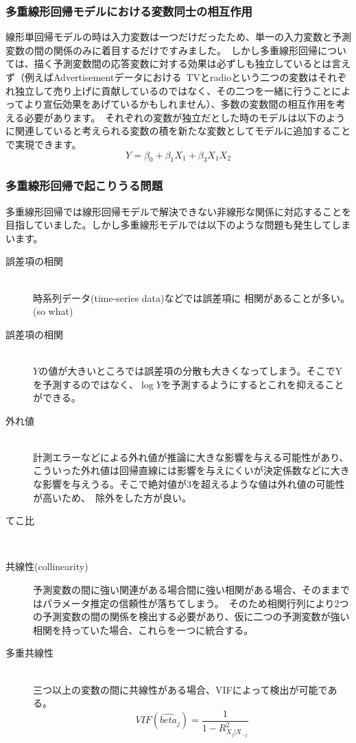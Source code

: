 \documentclass[uplatex]{jsarticle}
\begin{document}
\subsubsection{多重線形回帰モデルにおける変数同士の相互作用}
線形単回帰モデルの時は入力変数は一つだけだったため、単一の入力変数と予測変数の間の関係のみに着目するだけですみました。\
しかし多重線形回帰については、描く予測変数間の応答変数に対する効果は必ずしも独立しているとは言えず（例えばAdvertisementデータにおける\
TVとradioという二つの変数はそれぞれ独立して売り上げに貢献しているのではなく、その二つを一緒に行うことによってより宣伝効果をあげているかもしれません）、多数の変数間の相互作用を考える必要があります。\
それぞれの変数が独立だとした時のモデルは以下のように関連していると考えられる変数の積を新たな変数としてモデルに追加することで実現できます。
$$Y = \beta_0 + \beta_1 X_1 + \beta_3 X_1X_2$$

\subsubsection{多重線形回帰で起こりうる問題}
多重線形回帰では線形回帰モデルで解決できない非線形な関係に対応することを目指していました。しかし多重線形モデルでは以下のような問題も発生してしまいます。
\begin{description}
  \item[誤差項の相関]\mbox{}\\
  時系列データ(time-series data)などでは誤差項に 相関があることが多い。(so what)
  \item[誤差項の相関]\mbox{}\\
  $Y$の値が大きいところでは誤差項の分散も大きくなってしまう。そこでYを予測するのではなく、$\log{Y}$を予測するようにするとこれを抑えることができる。
  \item[外れ値]\mbox{}\\
  計測エラーなどによる外れ値が推論に大きな影響を与える可能性があり、こういった外れ値は回帰直線には影響を与えにくいが決定係数などに大きな影響を与えうる。そこで絶対値が3を超えるような値は外れ値の可能性が高いため、\
  除外をした方が良い。
  \item[てこ比]\mbox{}\\
  \item[共線性(collinearity)]
  予測変数の間に強い関連がある場合間に強い相関がある場合、そのままではパラメータ推定の信頼性が落ちてしまう。\
  そのため相関行列により2つの予測変数の間の関係を検出する必要があり、仮に二つの予測変数が強い相関を持っていた場合、これらを一つに統合する。
  \item[多重共線性]\mbox{}\\
  三つ以上の変数の間に共線性がある場合、VIFによって検出が可能である。
  $$VIF(\hat{beta}_j) = \frac{1}{1 - R^2_{X_j|X_{-j}}}$$
\end{description}
\end{document}
